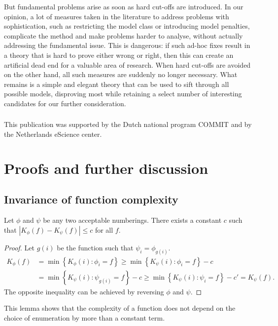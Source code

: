 \documentclass{style/llncs}
\begin{document}
But fundamental problems arise as soon as hard cut-offs are introduced. In our opinion, a lot of measures taken in the literature to address problems with sophistication, such as restricting the model class or introducing model penalties, complicate the method and make problems harder to analyse, without actually addressing the fundamental issue. This is dangerous: if such ad-hoc fixes result in a theory that is hard to prove either wrong or right, then this can create an artificial dead end for a valuable area of research. When hard cut-offs are avoided on the other hand, all such measures are suddenly no longer necessary. What remains is a simple and elegant theory that can be used to sift through all possible models, disproving most while retaining a select number of interesting candidates for our further consideration.

\subsubsection*{\ackname}

This publication was supported by the Dutch national program COMMIT and by  the Netherlands eScience center.




\appendix

\section{Proofs and further discussion}

\subsection{Invariance of function complexity}

\begin{lemma}
Let $\phi$ and $\psi$ be any two acceptable numberings. There exists a constant $c$ such that $\left| K_\phi(f) - K_\psi(f)\right | \leq c$ for all $f$. \label{lemma:invariance}
\end{lemma}
\begin{proof}
Let $g(i)$ be the function such that $\psi_i=\phi_{g(i)}$.
\begin{align*}
K_\phi(f) &= \min\left\{ K_\phi(i) : \phi_i= f\right\} 
\geq \min\left\{ K_\psi(i) : \phi_i= f\right\} - c\\
&= \min\left\{ K_\psi(i) : \psi_{g(i)}= f\right\} - c
\geq \min\left\{ K_\psi(i) : \psi_i= f\right\} - c' = K_\psi(f).
\end{align*}
The opposite inequality can be achieved by reversing $\phi$ and $\psi$. 
\end{proof}
This lemma shows that the complexity of a function does not depend on the choice of
enumeration by more than a constant term.
\end{document}
